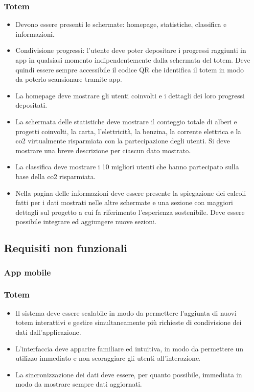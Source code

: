\subsubsection{Totem}
\begin{itemize}
    \item Devono essere presenti le schermate: homepage, statistiche, classifica e informazioni.
    \item Condivisione progressi: l'utente deve poter depositare i progressi raggiunti in app in qualsiasi momento indipendentemente dalla schermata del totem. Deve quindi essere sempre accessibile il codice QR che identifica il totem in modo da poterlo scansionare tramite app.
    \item La homepage deve mostrare gli utenti coinvolti e i dettagli dei loro progressi depositati.
    \item La schermata delle statistiche deve mostrare il conteggio totale di alberi e progetti coinvolti, la carta, l'elettricità, la benzina, la corrente elettrica e la co2 virtualmente risparmiata con la partecipazione degli utenti. Si deve mostrare una breve descrizione per ciascun dato mostrato.
    \item La classifica deve mostrare i 10 migliori utenti che hanno partecipato sulla base della co2 risparmiata.
    \item Nella pagina delle informazioni deve essere presente la spiegazione dei calcoli fatti per i dati mostrati nelle altre schermate e una sezione con maggiori dettagli sul progetto a cui fa riferimento l'esperienza sostenibile. Deve essere possibile integrare ed aggiungere nuove sezioni.
\end{itemize}
\subsection{Requisiti non funzionali}
\subsubsection{App mobile}
\subsubsection{Totem}
\begin{itemize}
    \item Il sistema deve essere scalabile in modo da permettere l'aggiunta di nuovi totem interattivi e gestire simultaneamente più richieste di condivisione dei dati dall'applicazione.
    \item L'interfaccia deve apparire familiare ed intuitiva, in modo da permettere un utilizzo immediato e non scoraggiare gli utenti all'interazione.
    \item La sincronizzazione dei dati deve essere, per quanto possibile, immediata in modo da mostrare sempre dati aggiornati.
\end{itemize}


